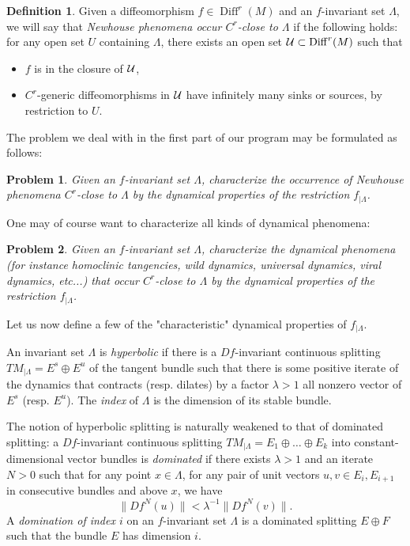 \documentclass[11pt, a4paper]{amsart}
\theoremstyle{plain}
\newtheorem{problem}{Problem}[section]	    %
\theoremstyle{definition}
\newtheorem{definition}{Definition}[proposition]
\theoremstyle{remark}
\numberwithin{equation}{section}         %
\DeclareMathOperator{\Diff}{{Diff}}
\def\Diff{\operatorname{Diff}}
\begin{document}
\begin{definition}
Given a diffeomorphism $f\in \Diff^r(M)$ and an $f$-invariant set $\Lambda$, we will say that {\em Newhouse phenomena occur $C^r$-close to $\Lambda$} if the following holds:  for any open set $U$ containing $\Lambda$, there exists an open set $\cU\subset \Diff^r(M)$ such that 
\begin{itemize}
\item  $f$ is in the closure of ${\mathcal U}$,
\item $C^r$-generic diffeomorphisms in ${\mathcal U}$ have infinitely many sinks or sources, by restriction to $U$.
\end{itemize}
\end{definition}

The problem we deal with in the first part of our program may be formulated as follows:
\begin{problem}\label{p.newh}
Given an $f$-invariant set $\Lambda$, characterize the occurrence of Newhouse phenomena $C^r$-close to $\Lambda$ by the dynamical properties of the restriction $f_{|\Lambda}$.
\end{problem}

One may of course want to characterize all kinds of dynamical phenomena:

\begin{problem}\label{p.general}
Given an $f$-invariant set $\Lambda$, characterize the dynamical phenomena (for instance homoclinic tangencies, wild dynamics, universal dynamics, viral dynamics, etc...) that occur $C^r$-close to $\Lambda$ by the dynamical properties of the restriction $f_{|\Lambda}$.
\end{problem}

Let us now define a few of the "characteristic" dynamical properties of $f_{|\Lambda}$.


An invariant set $\Lambda$ is {\em hyperbolic} if there is a $Df$-invariant continuous splitting $TM_{|\Lambda}=E^s\oplus E^u$ of the tangent bundle such that there is some positive iterate of the dynamics that contracts (resp. dilates) by a factor $\lambda>1$ all nonzero vector of $E^s$ (resp. $E^u$). The {\em index} of $\Lambda$ is the dimension of its stable bundle.

The notion of hyperbolic splitting is naturally weakened to that of dominated splitting: a $Df$-invariant continuous splitting $TM_{|\Lambda}=E_1\oplus \ldots \oplus E_k$ into constant-dimensional vector bundles is {\em dominated} if there exists $\lambda>1$ and an iterate $N>0$ such that for any point $x\in \Lambda$, for any pair of unit vectors $u,v\in E_i, E_{i+1}$ in consecutive bundles and above $x$, we have
$$\|Df^N(u)\|<\lambda^{-1}\|Df^N(v)\|.$$
A {\em domination of index $i$} on an $f$-invariant set $\Lambda$ is a dominated splitting $E\oplus F$ such that the bundle $E$ has dimension $i$. 
\end{document}
